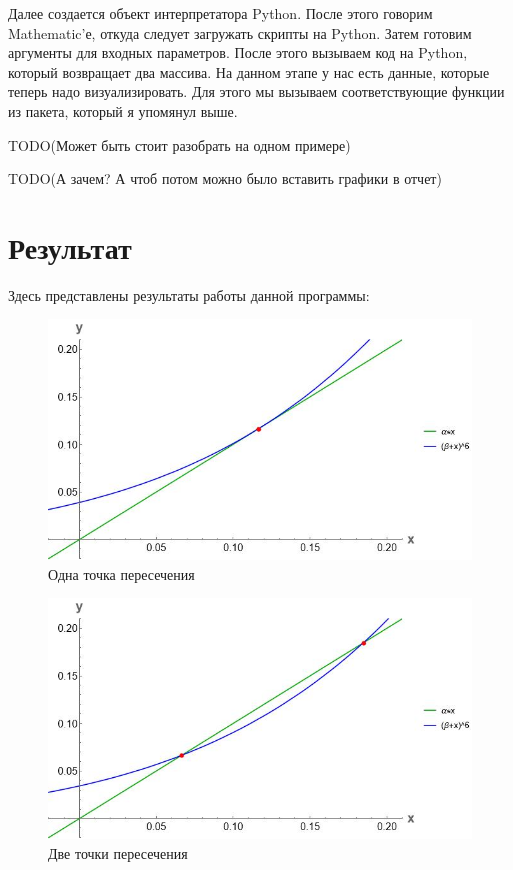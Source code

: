 \documentclass[14pt]{extarticle}
\begin{document}
        Далее создается объект интерпретатора Python. После этого говорим Mathematic'е, откуда следует загружать скрипты на Python. Затем готовим аргументы для входных параметров. После этого вызываем код на Python, который возвращает два массива. На данном этапе у нас есть данные, которые теперь надо визуализировать. Для этого мы вызываем соответствующие функции из пакета, который я упомянул выше.

        TODO(Может быть стоит разобрать на одном примере)

        TODO(А зачем? А чтоб потом можно было вставить графики в отчет)

    \section*{Результат}

        Здесь представлены результаты работы данной программы:

        \begin{figure}[ht]
            \centering
            \includegraphics[width=\textwidth]{images/one_intersection.jpg}
            \caption{Одна точка пересечения}
        \end{figure}

        \begin{figure}[ht]
            \centering
            \includegraphics[width=\textwidth]{images/two_intersection.jpg}
            \caption{Две точки пересечения}
        \end{figure}
\end{document}
